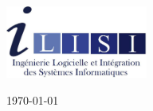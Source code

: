 \begin{titlepage}
\begin{center}
\begin{minipage}{0.4\textwidth}
\begin{flushright}
\end{flushright}
\end{minipage}
\\[1cm]
\includegraphics[width=0.35\textwidth]{./logo.jpg}
\\[1cm]
\vfill

{\large \today}

\end{center}
\end{titlepage}